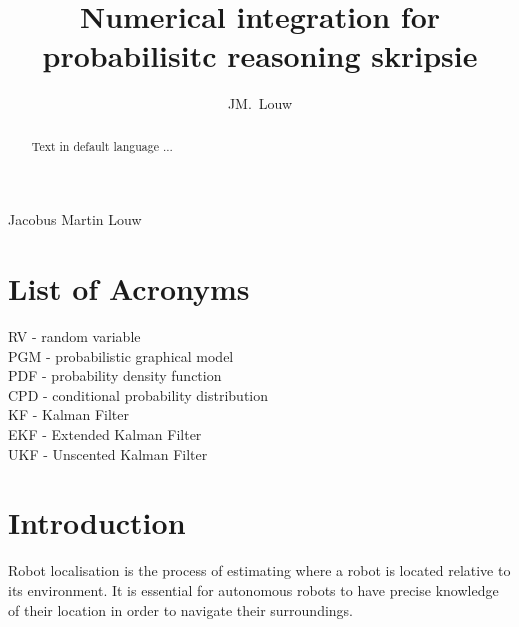 \documentclass[12pt,oneside,openany,a4paper, %
afrikaans,english,
]{memoir}
\numberwithin{equation}{chapter}
\newcommand*{\WaterMark}[2][0.15\paperwidth]{%
\AddToShipoutPicture*{\AtTextCenter{%
\parbox[c]{0pt}{\makebox[0pt][c]{%
\texttt{[image: \#2]}}}}}}
\begin{document}
\pagestyle{plain}
\frontmatter
\title{Numerical integration for probabilisitc reasoning skripsie}
\author{JM.\ Louw}{Jacobus Martin Louw}
\frontmatter
\WaterMark{UScrest-WM}
\TitlePage

\DeclarationPage

\address{Department of Electrical and Electronic Engineering,\\
University of Stellenbosch,\\
Private Bag X1, 7602 Matieland, South Africa.}
\newpage

\tableofcontents
{}
\pagebreak
\listoffigures

\chapter{List of Acronyms}
RV -	random variable\\
PGM		-	probabilistic graphical model\\
PDF		-	probability density function\\
CPD		-	conditional probability distribution\\
KF		-	Kalman Filter\\
EKF		-	Extended Kalman Filter\\
UKF		-	Unscented Kalman Filter\\

\begin{abstract}
Text in default language ...
\end{abstract}


\mainmatter
\chapter{Introduction}
Robot localisation is the process of estimating where a robot is located relative to its environment. It is essential for autonomous robots to have precise knowledge of their location in order to navigate their surroundings.
\end{document}
